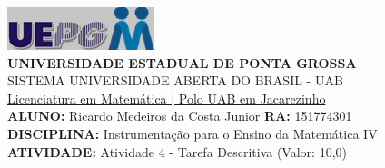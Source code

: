 \documentclass[a4paper, 12pt]{article}
\begin{document}
\includegraphics{logo}\\
\textbf{UNIVERSIDADE ESTADUAL DE PONTA GROSSA} \\
SISTEMA UNIVERSIDADE ABERTA DO BRASIL - UAB \\
\underline{Licenciatura em Matemática | Polo UAB em Jacarezinho} \\
\textbf{ALUNO:} Ricardo Medeiros da Costa Junior   \textbf{RA:} 151774301 \\
\textbf{DISCIPLINA:} Instrumentação para o Ensino da Matemática IV \\
\textbf{ATIVIDADE:} Atividade 4 - Tarefa Descritiva (Valor: 10,0) \\
\end{document}
